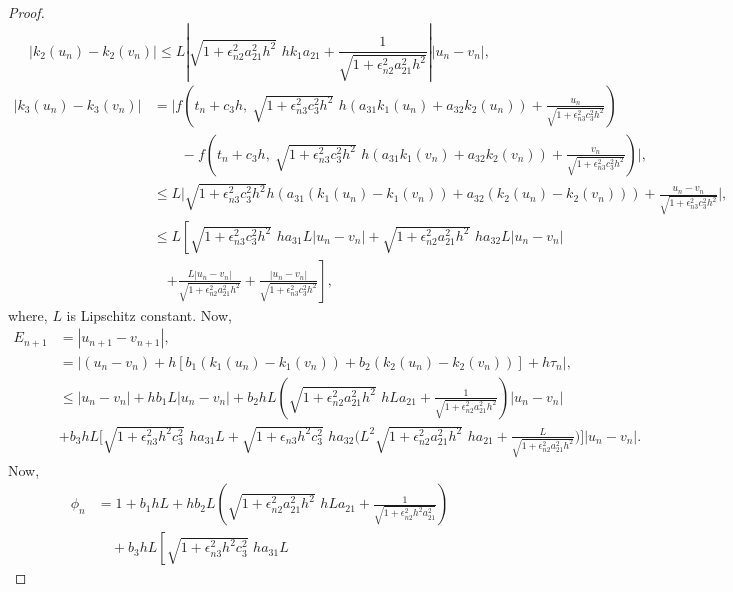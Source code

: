 \documentclass[a4paper, preprint,11pt]{elsarticle}
\numberwithin{equation}{section}
\begin{document}
\begin{proof}
\begin{equation*}
     |k_2(u_n) - k_2(v_n)|\leq L\left|\sqrt{1 + \epsilon_{n2}^2a_{21}^2h^2}\,\,hk_1a_{21} +\frac{1}{\sqrt{1 +\epsilon_{n2}^2a_{21}^2h^2}}\right||u_n - v_n|,
 \end{equation*}
 \begin{align*}
|k_3(u_n) - k_3(v_n)| 
&= \Bigg| 
f\left(t_n + c_3 h,\ \sqrt{1 + \epsilon_{n3}^2 c_3^2 h^2} \,\, h (a_{31} k_1(u_n) + a_{32} k_2(u_n)) 
+ \frac{u_n}{\sqrt{1 + \epsilon_{n3}^2 c_3^2 h^2}} \right) \\
&\qquad - 
f\left(t_n + c_3 h,\ \sqrt{1 + \epsilon_{n3}^2 c_3^2 h^2} \,\,  h (a_{31} k_1(v_n) + a_{32} k_2(v_n)) 
+ \frac{v_n}{\sqrt{1 + \epsilon_{n3}^2 c_3^2 h^2}} \right)
\Bigg|, \\
&\leq L \Bigg| 
\sqrt{1 + \epsilon_{n3}^2 c_3^2 h^2}  h \left( a_{31}(k_1(u_n) - k_1(v_n)) 
+ a_{32}(k_2(u_n) - k_2(v_n)) \right) 
+ \frac{u_n - v_n}{\sqrt{1 + \epsilon_{n3}^2 c_3^2 h^2}} 
\Bigg|, \\
&\leq L \left[ 
\sqrt{1 + \epsilon_{n3}^2 c_3^2 h^2} \,\, h a_{31} L |u_n - v_n| 
+ \sqrt{1 + \epsilon_{n2}^2 a_{21}^2 h^2} \,\,  h a_{32} L |u_n - v_n| \right. \\
&\quad \left. +  \frac{L|u_n - v_n|}{\sqrt{1 + \epsilon_{n2}^2 a_{21}^2 h^2}}
+ \frac{|u_n - v_n|}{\sqrt{1 + \epsilon_{n3}^2 c_3^2 h^2}} 
\right],
\end{align*}
where, $L$ is Lipschitz constant. 
Now,
\begin{align*}
    E_{n+1} & = |u_{n+1} - v_{n+1}|, \\
& = |(u_n - v_n) + h \left[ b_1(k_1(u_n) - k_1(v_n)) + b_2(k_2(u_n) - k_2(v_n))\right ] + h\tau_n|, \\
& \leq |u_n - v_n| + hb_1L|u_n - v_n| + b_2hL\left(\sqrt{1 + \epsilon_{n2}^2a_{21}^2h^2}\,\,hLa_{21} +  \frac{1}{\sqrt{1 +\epsilon_{n2}^2a_{21}^2h^2}}\right)|u_n - v_n| \\
& + b_3hL \Biggr[ \sqrt{1 + \epsilon_{n3}^2h^2c_3^2}\,\,ha_{31}L  + \sqrt{1+\epsilon_{n3}h^2c_3^2}\,\,ha_{32} \Biggr(L^2\sqrt{1 + \epsilon_{n2}^2a_{21}^2h^2}\,\,ha_{21} + \frac{L}{\sqrt{1 + \epsilon_{n2}^2a_{21}^2h^2}}\Biggl)\Biggr]|u_n - v_n|. 
\end{align*}
Now,
\begin{align*}
    \phi_n &= 1 + b_1 h L 
    + h b_2 L \left( \sqrt{1 + \epsilon_{n2}^2 a_{21}^2 h^2}\,\, h L a_{21} + \frac{1}{\sqrt{1 + \epsilon_{n2}^2 h^2 a_{21}^2}} \right) \\
    &\quad + b_3 h L \left[ \sqrt{1 + \epsilon_{n3}^2 h^2 c_3^2}\,\, h a_{31} L 

\end{align*}
\end{proof}
\end{document}
